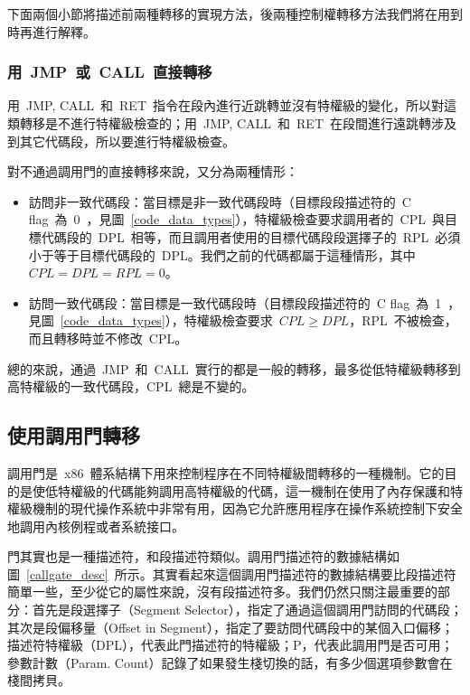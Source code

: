 下面兩個小節將描述前兩種轉移的實現方法，後兩種控制權轉移方法我們將在用到時再進行解釋。

\subsubsection{用~JMP~或~CALL~直接轉移}

用~JMP, CALL~和~RET~指令在段內進行近跳轉並沒有特權級的變化，所以對這類轉移是不進行特權級檢查的；用~JMP, CALL~和~RET~在段間進行遠跳轉涉及到其它代碼段，所以要進行特權級檢查。

對不通過調用門的直接轉移來說，又分為兩種情形：

\begin{itemize}
\item{訪問非一致代碼段}：當目標是非一致代碼段時（目標段段描述符的~C flag~為~0~，見圖~\ref{code_data_types}），特權級檢查要求調用者的~CPL~與目標代碼段的~DPL~相等，而且調用者使用的目標代碼段段選擇子的~RPL~必須小于等于目標代碼段的~DPL。我們之前的代碼都屬于這種情形，其中~$CPL=DPL=RPL=0$。
\item{訪問一致代碼段}：當目標是一致代碼段時（目標段段描述符的~C flag~為~1~，見圖~\ref{code_data_types}），特權級檢查要求~$CPL \ge DPL$，RPL~不被檢查，而且轉移時並不修改~CPL。
\end{itemize}

總的來說，通過~JMP~和~CALL~實行的都是一般的轉移，最多從低特權級轉移到高特權級的一致代碼段，CPL~總是不變的。

\subsection{使用調用門轉移}\label{CHpm_callgate}

調用門是~x86~體系結構下用來控制程序在不同特權級間轉移的一種機制。它的目的是使低特權級的代碼能夠調用高特權級的代碼，這一機制在使用了內存保護和特權級機制的現代操作系統中非常有用，因為它允許應用程序在操作系統控制下安全地調用內核例程或者系統接口。


門其實也是一種描述符，和段描述符類似。調用門描述符的數據結構如圖~\ref{callgate_desc}~所示。其實看起來這個調用門描述符的數據結構要比段描述符簡單一些，至少從它的屬性來說，沒有段描述符多。我們仍然只關注最重要的部分：首先是段選擇子（Segment Selector），指定了通過這個調用門訪問的代碼段；其次是段偏移量（Offset in Segment），指定了要訪問代碼段中的某個入口偏移；描述符特權級（DPL），代表此門描述符的特權級；P，代表此調用門是否可用；參數計數（Param. Count）記錄了如果發生棧切換的話，有多少個選項參數會在棧間拷貝。

